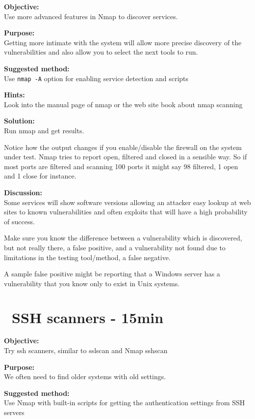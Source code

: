 \documentclass[a4paper,11pt,notitlepage]{report}
\begin{document}
{\bf Objective:} \\
Use more advanced features in Nmap to discover services.

{\bf Purpose:}\\
Getting more intimate with the system will allow more precise discovery of the vulnerabilities and also allow you to select the next tools to run.

{\bf Suggested method:}\\
Use \verb+nmap -A+ option for enabling service detection and scripts

{\bf Hints:} \\
Look into the manual page of nmap or the web site book about nmap scanning

{\bf Solution:}\\
Run nmap and get results.

Notice how the output changes if you enable/disable the firewall on the system under test. Nmap tries to report open, filtered and closed in a sensible way. So if most ports are filtered and scanning 100 ports it might say 98 filtered, 1 open and 1 close for instance.

{\bf Discussion:}\\
Some services will show software versions allowing an attacker easy lookup at web sites to known vulnerabilities and often exploits that will have a high probability of success.

Make sure you know the difference between a vulnerability which is discovered, but not really there, a false positive, and a vulnerability not found due to limitations in the testing tool/method, a false negative.

A sample false positive might be reporting that a Windows server has a vulnerability that you know only to exist in Unix systems.


\chapter{\faExclamationTriangle\ SSH scanners - 15min}
\label{ex:nmap-ssh-scanner}

{\bf Objective:}\\
Try ssh scanners, similar to sslscan and Nmap sshscan

{\bf Purpose:}\\
We often need to find older systems with old settings.

{\bf Suggested method:}\\
Use Nmap with built-in scripts for getting the authentication settings from SSH servers
\end{document}
